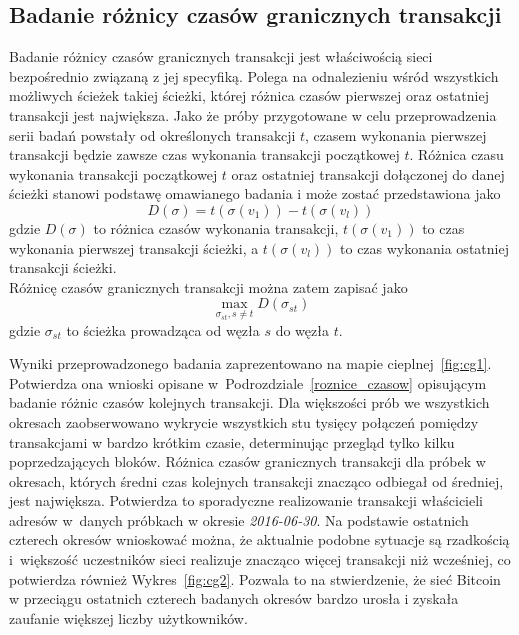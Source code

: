 \documentclass[12pt, oneside, final, openany]{mgr}
\begin{document}
\if@archive\else{\newpage}\fi
\subsection{Badanie różnicy czasów granicznych transakcji}
\label{graniczne_transakcje}
\indent Badanie różnicy czasów granicznych transakcji jest właściwością sieci bezpośrednio związaną z jej specyfiką. Polega na odnalezieniu wśród wszystkich możliwych ścieżek takiej ścieżki, której różnica czasów pierwszej oraz ostatniej transakcji jest największa. Jako że próby przygotowane w celu przeprowadzenia serii badań powstały od określonych transakcji $t$, czasem wykonania pierwszej transakcji będzie zawsze czas wykonania transakcji początkowej $t$. Różnica czasu wykonania transakcji początkowej $t$ oraz ostatniej transakcji dołączonej do danej ścieżki stanowi podstawę omawianego badania i może zostać przedstawiona jako
\begin{equation}
D(\sigma) = t(\sigma(v_1)) - t(\sigma(v_l))
\end{equation}
gdzie $D(\sigma)$ to różnica czasów wykonania transakcji, $t(\sigma(v_1))$ to czas wykonania pierwszej transakcji ścieżki, a $t(\sigma(v_l))$ to czas wykonania ostatniej transakcji ścieżki.
\\ Różnicę czasów granicznych transakcji można zatem zapisać jako
\begin{equation}
 \max_{\sigma_{st},s \ne t} D(\sigma_{st})
\end{equation}
gdzie $\sigma_{st}$ to ścieżka prowadząca od węzła $s$ do węzła $t$.

\indent Wyniki przeprowadzonego badania zaprezentowano na mapie cieplnej~\ref{fig:cg1}. Potwierdza ona wnioski opisane w~Podrozdziale~\ref{roznice_czasow} opisującym badanie różnic czasów kolejnych transakcji. Dla większości prób we wszystkich okresach zaobserwowano wykrycie wszystkich stu tysięcy połączeń pomiędzy transakcjami w bardzo krótkim czasie, determinując przegląd tylko kilku poprzedzających bloków. Różnica czasów granicznych transakcji dla próbek w okresach, których średni czas kolejnych transakcji znacząco odbiegał od średniej, jest największa. Potwierdza to sporadyczne realizowanie transakcji właścicieli adresów w~danych próbkach w okresie \textit{2016-06-30}. Na podstawie ostatnich czterech okresów wnioskować można, że aktualnie podobne sytuacje są rzadkością i~większość uczestników sieci realizuje znacząco więcej transakcji niż wcześniej, co potwierdza również Wykres~\ref{fig:cg2}. Pozwala to na stwierdzenie, że sieć Bitcoin w przeciągu ostatnich czterech badanych okresów bardzo urosła i zyskała zaufanie większej liczby użytkowników.
\end{document}
